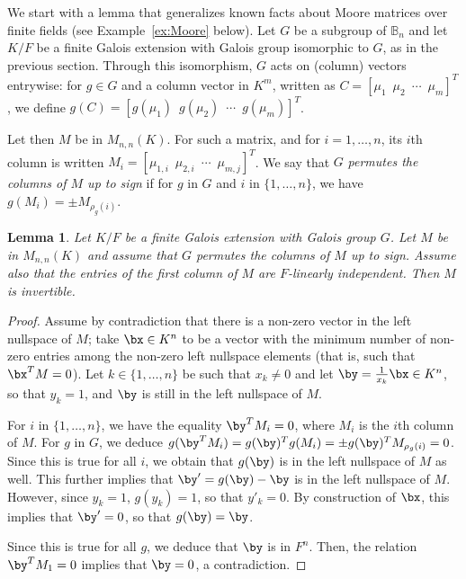 \documentclass[12pt]{article}
\theoremstyle{plain}
\newtheorem{lemma}[theorem]{Lemma}
\begin{document}
We start with a lemma that generalizes known facts about Moore
matrices over finite fields (see Example~\ref{ex:Moore} below). Let
$G$ be a subgroup of $\mathbb{B}_n$ and let $K/F$ be a finite Galois
extension with Galois group isomorphic to $G$, as in the previous
section. Through this isomorphism, $G$ acts on (column) vectors
entrywise: for $g \in G$ and a column vector in $K^m$, written as $C =
\left[\mu_{1} \,\,\, \mu_{2} \,\,\, \cdots \,\,\, \mu_{m}\right]^T$,
we define $g(C) = \left[g(\mu_{1}) \,\,\, g(\mu_{2}) \,\,\, \cdots
  \,\,\, g(\mu_{m})\right]^T$.

Let then $M$ be in $M_{n,n}(K)$. For such a matrix, and for
$i=1,\dots,n$, its $i$th column is written $M_i=\left[\mu_{1,i} \,\,\,
  \mu_{2,i} \,\,\, \cdots \,\,\, \mu_{m,j}\right]^T$.  We say that $G$
{\em permutes the columns of $M$ up to sign} if for $g$ in $G$ and $i$
in $\{1,\dots,n\}$, we have $g(M_i)= \pm M_{\rho_g(i)}$.
 
\begin{lemma}\label{signdet}
   Let $K/F$ be a finite Galois extension with Galois group $G$. Let
   $M$ be in $M_{n,n}(K)$ and assume that $G$ permutes the columns of
   $M$ up to sign. Assume also that the entries of the first column
 of $M$ are $F$-linearly independent. Then $M$ is invertible.
\end{lemma}
\begin{proof}
  Assume by contradiction that there is a non-zero vector in the left
  nullspace of $M$; take $\bx \in K^n$ to be a vector with the minimum number of
  non-zero entries among the non-zero left nullspace elements
  (that is, such that $\bx^T M=0$).
  Let $k \in \{1,\dots,n\}$ be such that $x_k \neq 0$ and let
  $\by=\frac 1{x_k} \bx \in K^n$, so that $y_k = 1$, and $\by$ is
  still in the left nullspace of $M$. 
  
  For $i$ in $\{1,\dots,n\}$, we have the equality $\by^T M_i = 0 $,
  where $M_i$ is the $i$th column of $M$. For $g$ in $G$, we deduce
  $g(\by^T M_i) = g(\by)^Tg(M_i) = \pm g(\by)^T M_{\rho_g(i)} = 0$. Since
  this is true for all $i$, we obtain that $g(\by)$ is in the
  left nullspace of $M$ as well. This further implies that
  $\by'=g(\by)-\by$ is in the left nullspace of $M$. However, since
  $y_k=1$, $g(y_k)=1$, so that $y'_k=0$. By construction of $\bx$, this
  implies that $\by'=0$, so that $g(\by)=\by$. 

  Since this is true for all $g$, we deduce that $\by$ is in $F^n$.
  Then, the relation $\by^T M_1=0$ implies that $\by=0$, a
  contradiction.
 \end{proof} 
\end{document}
